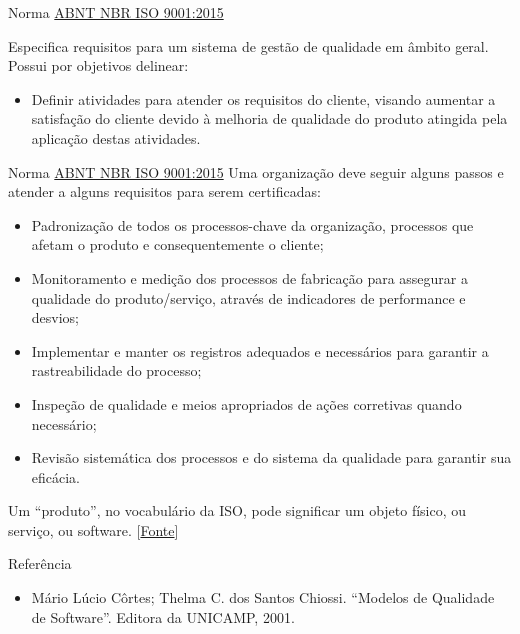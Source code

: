 \begin{frame}{Norma \href{https://www.abntcatalogo.com.br/norma.aspx?ID=345041}{ABNT NBR ISO 9001:2015}}

Especifica requisitos para um sistema de gestão de qualidade em
âmbito geral. Possui por objetivos delinear:
\pause
\begin{itemize}
\item Definir atividades para atender os requisitos do cliente, visando
aumentar a satisfação do cliente devido à melhoria de qualidade do
produto atingida pela aplicação destas atividades.
\end{itemize}

\end{frame}

\begin{frame}{Norma \href{https://www.abntcatalogo.com.br/norma.aspx?ID=345041}{ABNT NBR ISO 9001:2015}}
\footnotesize
Uma organização deve seguir alguns passos e atender a alguns
requisitos para serem certificadas:
\pause
\begin{itemize}[<+->]
\item Padronização de todos os processos-chave da organização, processos que afetam o produto e consequentemente o cliente;
\item Monitoramento e medição dos processos de fabricação para assegurar a qualidade do produto/serviço, através de indicadores de performance e desvios;
\item Implementar e manter os registros adequados e necessários para garantir a rastreabilidade do processo;
\item Inspeção de qualidade e meios apropriados de ações corretivas quando necessário; 
\item Revisão sistemática dos processos e do sistema da qualidade para garantir sua eficácia.
\end{itemize}

Um ``produto'', no vocabulário da ISO, pode significar um objeto
físico, ou serviço, ou software. [\href{https://pt.wikipedia.org/wiki/ISO_9000}{Fonte}]

\end{frame}

\begin{frame}{Referência}
\begin{itemize}
\item Mário Lúcio Côrtes; Thelma C. dos Santos Chiossi. ``Modelos de Qualidade de Software''. Editora da UNICAMP, 2001.
\end{itemize}
\end{frame}
